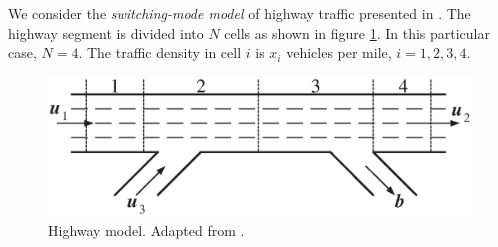 \documentclass{report}
\begin{document}
We  consider the {\it switching-mode model} of highway traffic
presented in \cite{xiaotian}. The highway segment is divided into $N$ cells
as shown in figure \ref{hwfig}. In this particular case, $N=4$.
The traffic density in cell $i$ is  $x_i$ vehicles per mile, $i=1,2,3,4$.
\begin{figure}[htbp]
\centerline{
\includegraphics[height=5 cm]{hw.eps}}
\caption{Highway model. Adapted from \cite{xiaotian}.}
\label{hwfig}
\end{figure}
\end{document}
